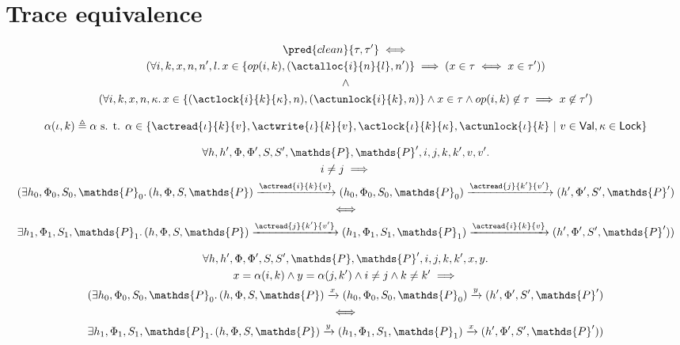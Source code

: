 \section{Trace equivalence}

\begin{gather*}
	\pred{clean}{\tau, \tau'} \iff \\
	(\forall i, k, x, n, n', l \ldotp x \in \{op(i, k), (\actalloc{i}{n}{l}, n')\} \implies (x \in \tau \iff x \in \tau')) \\
	\land \\
	(\forall i, k, x, n, \kappa \ldotp x \in \{ (\actlock{i}{k}{\kappa}, n), (\actunlock{i}{k}, n) \} \land x \in \tau \land op(i, k) \not\in \tau \implies x \not\in \tau')
\end{gather*}

\[
	\alpha(\iota, k) \triangleq \alpha \text{ s. t. }
	\alpha \in 
		\{
			\actread{\iota}{k}{v},
			\actwrite{\iota}{k}{v},
			\actlock{\iota}{k}{\kappa},
			\actunlock{\iota}{k}\
			|\ v \in \mathsf{Val}, \kappa \in \mathsf{Lock}
		\}
\]

\lem
\begin{gather*}
	\forall h, h', \Phi, \Phi', S, S', \mathds{P}, \mathds{P}', i, j, k, k', v, v' \ldotp \\
	 i \neq j \implies
	 \\
	(\exists h_0, \Phi_0, S_0, \mathds{P}_0 \ldotp 
	(h, \Phi, S, \mathds{P}) \xrightarrow{\actread{i}{k}{v}} (h_0, \Phi_0, S_0, \mathds{P}_0)  \xrightarrow{\actread{j}{k'}{v'}} (h', \Phi', S', \mathds{P}') \\
	\iff \\
	\exists h_1, \Phi_1, S_1, \mathds{P}_1 \ldotp
	(h, \Phi, S, \mathds{P}) \xrightarrow{\actread{j}{k'}{v'}} (h_1, \Phi_1, S_1, \mathds{P}_1) \xrightarrow{\actread{i}{k}{v}} (h', \Phi', S', \mathds{P}'))
\end{gather*}

\lem
\begin{gather*}
	\forall h, h', \Phi, \Phi', S, S', \mathds{P}, \mathds{P}', i, j, k, k', x, y \ldotp \\
	x = \alpha(i, k) \land y = \alpha(j, k') \land i \neq j \land k \neq k' \implies \\
	(\exists h_0, \Phi_0, S_0, \mathds{P}_0 \ldotp
	(h, \Phi, S, \mathds{P}) \xrightarrow{x} (h_0, \Phi_0, S_0, \mathds{P}_0)  \xrightarrow{y} (h', \Phi', S', \mathds{P}') \\
	\iff \\
	\exists h_1, \Phi_1, S_1, \mathds{P}_1 \ldotp
	(h, \Phi, S, \mathds{P}) \xrightarrow{y} (h_1, \Phi_1, S_1, \mathds{P}_1) \xrightarrow{x} (h', \Phi', S', \mathds{P}'))
\end{gather*}

